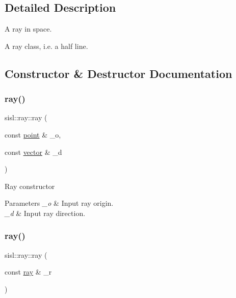 \subsection{Detailed Description}
A ray in space. 

A ray class, i.\+e. a half line. 

\subsection{Constructor \& Destructor Documentation}
\mbox{\label{structsisl_1_1ray_a4a18a538fceb31b4fe52b336a0b5f78a}} 
\subsubsection{\texorpdfstring{ray()}{ray()}\hspace{0.1cm}{\footnotesize\ttfamily [1/2]}}
{\footnotesize\ttfamily sisl\+::ray\+::ray (\begin{DoxyParamCaption}\item[{const \hyperlink{namespacesisl_afaf80b1234035c1dbd3d570c96c6a63a}{point} \&}]{\+\_\+o,  }\item[{const \hyperlink{namespacesisl_a2069bd5374a9be042ff3ce3306d41e1a}{vector} \&}]{\+\_\+d }\end{DoxyParamCaption})\hspace{0.3cm}{\ttfamily [inline]}}

Ray constructor 
\begin{DoxyParams}{Parameters}
{\em \+\_\+o} & Input ray origin. \\
\hline
{\em \+\_\+d} & Input ray direction. \\
\hline
\end{DoxyParams}
\mbox{\label{structsisl_1_1ray_a497629918619817a4f0ca31591a3382b}} 
\subsubsection{\texorpdfstring{ray()}{ray()}\hspace{0.1cm}{\footnotesize\ttfamily [2/2]}}
{\footnotesize\ttfamily sisl\+::ray\+::ray (\begin{DoxyParamCaption}\item[{const \hyperlink{structsisl_1_1ray}{ray} \&}]{\+\_\+r }\end{DoxyParamCaption})\hspace{0.3cm}{\ttfamily [inline]}}

